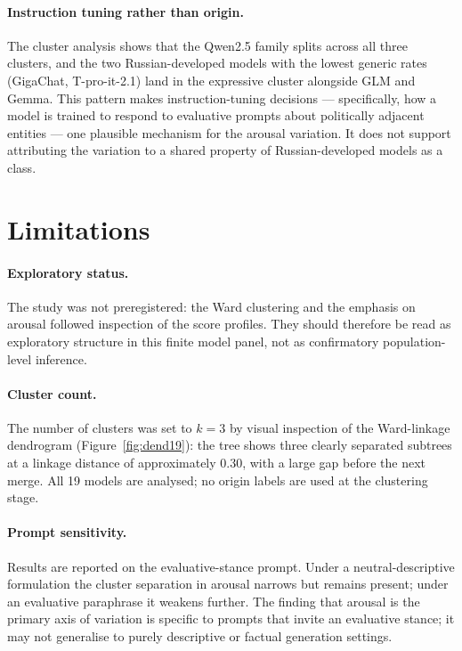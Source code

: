 \documentclass[runningheads,a4paper]{llncs}
\begin{document}
\paragraph{Instruction tuning rather than origin.}
The cluster analysis shows that the Qwen2.5 family splits across all three
clusters, and the two Russian-developed models with the lowest generic rates
(GigaChat, T-pro-it-2.1) land in the expressive cluster alongside GLM and
Gemma.
This pattern makes instruction-tuning decisions --- specifically, how a model
is trained to respond to evaluative prompts about politically adjacent
entities --- one plausible mechanism for the arousal variation. It does not
support attributing the variation to a shared property of Russian-developed
models as a class.

\section{Limitations}
\label{sec:limitations}

\paragraph{Exploratory status.}
The study was not preregistered: the Ward clustering and the emphasis on
arousal followed inspection of the score profiles. They should therefore be
read as exploratory structure in this finite model panel, not as confirmatory
population-level inference.

\paragraph{Cluster count.}
The number of clusters was set to $k=3$ by visual inspection of the
Ward-linkage dendrogram (Figure~\ref{fig:dend19}): the tree shows three
clearly separated subtrees at a linkage distance of approximately $0.30$,
with a large gap before the next merge.
All 19 models are analysed; no origin labels are used at the clustering
stage.

\paragraph{Prompt sensitivity.}
Results are reported on the evaluative-stance prompt.
Under a neutral-descriptive formulation the cluster separation in arousal
narrows but remains present; under an evaluative paraphrase it weakens
further. The finding that arousal is the primary axis of variation is
specific to prompts that invite an evaluative stance; it may not generalise
to purely descriptive or factual generation settings.
\end{document}
